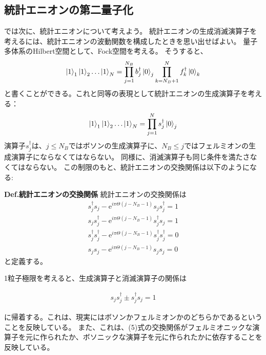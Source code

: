 \documentclass[a4paper,11pt]{jsarticle}
\numberwithin{equation}{section}
\begin{document}
\subsection{統計エニオンの第二量子化}
では次に、統計エニオンについて考えよう。
統計エニオンの生成消滅演算子を考えるには、統計エニオンの波動関数を構成したときを思い出せばよい。
量子多体系のHilbert空間として、Fock空間を考える。
そうすると、
\begin{align}
\ket{1}_1\ket{1}_2\dots\ket{1}_N=\prod _{j=1}^{N_B}b_j^{\dag}\ket{0}_j\prod _{k=N_B+1}^{N}f_k^{\dag}\ket{0}_k
\end{align}
と書くことができる。これと同等の表現として統計エニオンの生成演算子を考える：
\begin{align}
  \ket{1}_1\ket{1}_2\dots\ket{1}_N=\prod _{j=1}^{N}s_j^{\dag}\ket{0}_j
\end{align}
演算子$s_j^{\dag}$は、$j\leq N_B$ではボソンの生成演算子に、$N_B\leq j$ではフェルミオンの生成演算子にならなくてはならない。
同様に、消滅演算子も同じ条件を満たさなくてはならない。
この制限のもと、統計エニオンの交換関係は以下のようになる:\\

\begin{itembox}[l]{\textbf{Def.統計エニオンの交換関係 }}
  統計エニオンの交換関係は
\begin{align}
s_j^{\dag}s_j-\mathrm{e}^{i\pi\Theta(j-N_B-1)}s_j s_j^{\dag}=1\\
s_js_j^{\dag}-\mathrm{e}^{i\pi\Theta(j-N_B-1)}s_j^{\dag} s_j=1\\
s_j^{\dag}s_j^{\dag}-\mathrm{e}^{i\pi\Theta(j-N_B-1)}s_j^{\dag} s_j^{\dag}=0\\
s_js_j-\mathrm{e}^{i\pi\Theta(j-N_B-1)}s_j s_j=0
\end{align}
と定義する。
\end{itembox}

1粒子極限を考えると、生成演算子と消滅演算子の関係は

\begin{align}
s_js_j^{\dag}\pm s_j^{\dag}s_j=1
\end{align}

に帰着する。これは、現実にはボソンかフェルミオンかのどちらかであるということを反映している。
また、これは、(5)式の交換関係がフェルミオニックな演算子を元に作られたか、ボソニックな演算子を元に作られたかに依存することを反映している。
\end{document}
